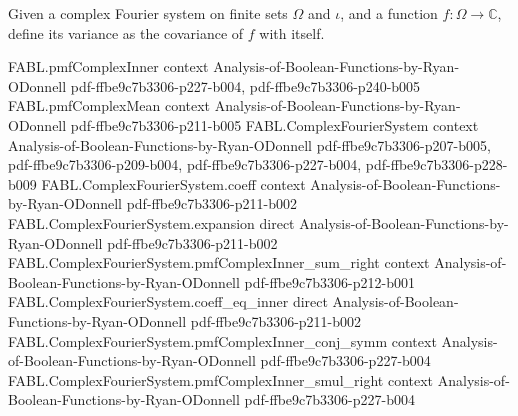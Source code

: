 \begin{definition}
\label{FABL.ComplexFourierSystem.variance}
\leanok
{}
Given a complex Fourier system on finite sets $\Omega$ and $\iota$, and a function
$f:\Omega\to\mathbb{C}$, define its variance as the covariance of $f$ with itself.
\end{definition}

\begin{theorem}
\label{FABL.ComplexFourierSystem.covariance_eq_sum_coeff}
\leanok
{}
\proofstep
  {FABL.pmfComplexInner}
  {context}
  {Analysis-of-Boolean-Functions-by-Ryan-ODonnell}
  {pdf-ffbe9c7b3306-p227-b004,
    pdf-ffbe9c7b3306-p240-b005}
\proofstep
  {FABL.pmfComplexMean}
  {context}
  {Analysis-of-Boolean-Functions-by-Ryan-ODonnell}
  {pdf-ffbe9c7b3306-p211-b005}
\proofstep
  {FABL.ComplexFourierSystem}
  {context}
  {Analysis-of-Boolean-Functions-by-Ryan-ODonnell}
  {pdf-ffbe9c7b3306-p207-b005,
    pdf-ffbe9c7b3306-p209-b004,
    pdf-ffbe9c7b3306-p227-b004,
    pdf-ffbe9c7b3306-p228-b009}
\proofstep
  {FABL.ComplexFourierSystem.coeff}
  {context}
  {Analysis-of-Boolean-Functions-by-Ryan-ODonnell}
  {pdf-ffbe9c7b3306-p211-b002}
\proofstep
  {FABL.ComplexFourierSystem.expansion}
  {direct}
  {Analysis-of-Boolean-Functions-by-Ryan-ODonnell}
  {pdf-ffbe9c7b3306-p211-b002}
\proofstep
  {FABL.ComplexFourierSystem.pmfComplexInner_sum_right}
  {context}
  {Analysis-of-Boolean-Functions-by-Ryan-ODonnell}
  {pdf-ffbe9c7b3306-p212-b001}
\proofstep
  {FABL.ComplexFourierSystem.coeff_eq_inner}
  {direct}
  {Analysis-of-Boolean-Functions-by-Ryan-ODonnell}
  {pdf-ffbe9c7b3306-p211-b002}
\proofstep
  {FABL.ComplexFourierSystem.pmfComplexInner_conj_symm}
  {context}
  {Analysis-of-Boolean-Functions-by-Ryan-ODonnell}
  {pdf-ffbe9c7b3306-p227-b004}
\proofstep
  {FABL.ComplexFourierSystem.pmfComplexInner_smul_right}
  {context}
  {Analysis-of-Boolean-Functions-by-Ryan-ODonnell}
  {pdf-ffbe9c7b3306-p227-b004}

\end{theorem}
